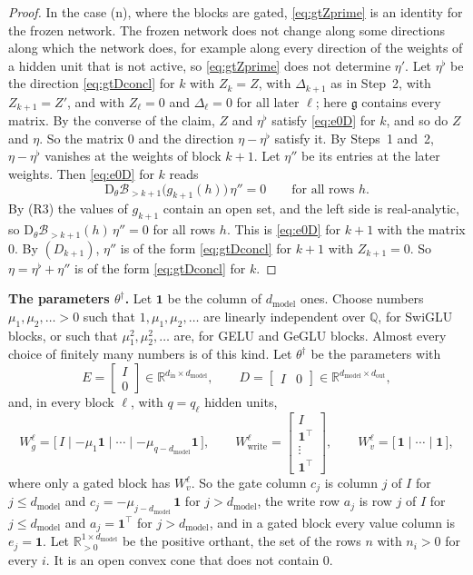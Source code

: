 \documentclass[10pt]{article}
\theoremstyle{definition}
\theoremstyle{remark}
\newcommand{\R}{\mathbb{R}}
\newcommand{\Wwrite}{W_{\mathrm{write}}}
\newcommand{\dm}{d_{\mathrm{model}}}
\newcommand{\Der}{\mathrm{D}}
\newcommand{\para}[1]{\smallskip\noindent\textbf{#1}\hspace{0.5em}}
\begin{document}
\begin{proof}
In the case (n), where the blocks are gated, \eqref{eq:gtZprime} is an identity for the frozen network. The frozen network does not change along some directions along which the network does, for example along every direction of the weights of a hidden unit that is not active, so \eqref{eq:gtZprime} does not determine $\eta'$. Let $\eta^\flat$ be the direction \eqref{eq:gtDconcl} for $k$ with $Z_k = Z$, with $\Delta_{k+1}$ as in Step~2, with $Z_{k+1} = Z'$, and with $Z_\ell = 0$ and $\Delta_\ell = 0$ for all later $\ell$; here $\mathfrak g$ contains every matrix. By the converse of the claim, $Z$ and $\eta^\flat$ satisfy \eqref{eq:e0D} for $k$, and so do $Z$ and $\eta$. So the matrix $0$ and the direction $\eta - \eta^\flat$ satisfy it. By Steps~1 and~2, $\eta - \eta^\flat$ vanishes at the weights of block $k+1$. Let $\eta''$ be its entries at the later weights. Then \eqref{eq:e0D} for $k$ reads
\[
\Der_\theta\mathcal B_{>k+1}\big(g_{k+1}(h)\big)\,\eta'' = 0 \qquad\text{for all rows } h .
\]
By (R3) the values of $g_{k+1}$ contain an open set, and the left side is real-analytic, so $\Der_\theta\mathcal B_{>k+1}(h)\,\eta'' = 0$ for all rows $h$. This is \eqref{eq:e0D} for $k+1$ with the matrix $0$. By $(D_{k+1})$, $\eta''$ is of the form \eqref{eq:gtDconcl} for $k+1$ with $Z_{k+1} = 0$. So $\eta = \eta^\flat + \eta''$ is of the form \eqref{eq:gtDconcl} for $k$.
\end{proof}

\para{The parameters $\theta^\dagger$.} Let $\mathbf 1$ be the column of $\dm$ ones. Choose numbers $\mu_1, \mu_2, \dots > 0$ such that $1, \mu_1, \mu_2, \dots$ are linearly independent over $\mathbb Q$, for SwiGLU blocks, or such that $\mu_1^2, \mu_2^2, \dots$ are, for GELU and GeGLU blocks. Almost every choice of finitely many numbers is of this kind. Let $\theta^\dagger$ be the parameters with
\[
E = \begin{bmatrix} I \\ 0 \end{bmatrix} \in \R^{d_{\mathrm{in}}\times\dm}, \qquad D = \begin{bmatrix} I & 0 \end{bmatrix} \in \R^{\dm\times d_{\mathrm{out}}},
\]
and, in every block $\ell$, with $q = q_\ell$ hidden units,
\[
W_g^{\ell} = \big[\,I \;\big|\; {-\mu_1\mathbf 1} \;\big|\; \cdots \;\big|\; {-\mu_{q-\dm}\mathbf 1}\,\big], \qquad \Wwrite^{\ell} = \begin{bmatrix} I \\ \mathbf 1^\top \\[-3pt] \vdots \\ \mathbf 1^\top \end{bmatrix}, \qquad W_v^{\ell} = \big[\,\mathbf 1 \;\big|\; \cdots \;\big|\; \mathbf 1\,\big] ,
\]
where only a gated block has $W_v^{\ell}$. So the gate column $c_j$ is column $j$ of $I$ for $j \le \dm$ and $c_j = -\mu_{j-\dm}\,\mathbf 1$ for $j > \dm$, the write row $a_j$ is row $j$ of $I$ for $j \le \dm$ and $a_j = \mathbf 1^\top$ for $j > \dm$, and in a gated block every value column is $e_j = \mathbf 1$. Let $\R^{1\times\dm}_{>0}$ be the positive orthant, the set of the rows $n$ with $n_i > 0$ for every $i$. It is an open convex cone that does not contain $0$.
\end{document}
